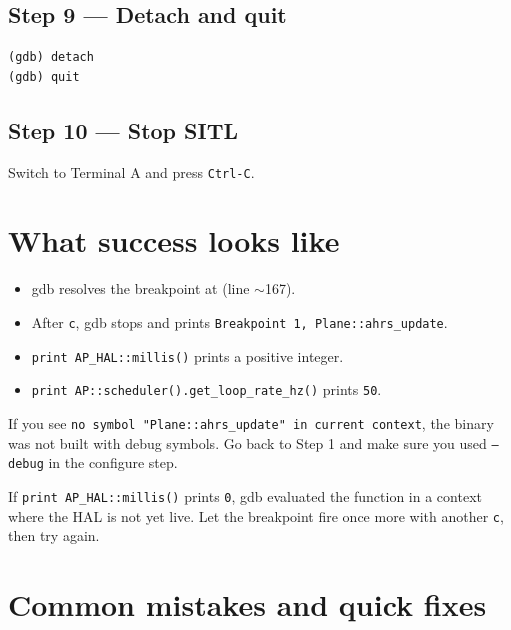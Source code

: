\documentclass[a4paper,11pt,twoside]{article}
\begin{document}
\subsection*{Step 9 --- Detach and quit}
\begin{Verbatim}[frame=single,fontsize=\small]
(gdb) detach
(gdb) quit
\end{Verbatim}

\subsection*{Step 10 --- Stop SITL}
Switch to Terminal A and press \texttt{Ctrl-C}.

\section*{What success looks like}
\begin{itemize}
  \item gdb resolves the breakpoint at  (line $\sim$167).
  \item After \texttt{c}, gdb stops and prints \texttt{Breakpoint 1, Plane::ahrs\_update}.
  \item \texttt{print AP\_HAL::millis()} prints a positive integer.
  \item \texttt{print AP::scheduler().get\_loop\_rate\_hz()} prints \texttt{50}.
\end{itemize}

If you see \texttt{no symbol "Plane::ahrs\_update" in current context}, the binary was not built with debug symbols. Go back to Step 1 and make sure you used \texttt{--debug} in the configure step.

If \texttt{print AP\_HAL::millis()} prints \texttt{0}, gdb evaluated the function in a context where the HAL is not yet live. Let the breakpoint fire once more with another \texttt{c}, then try again.

\section*{Common mistakes and quick fixes}
\end{document}
